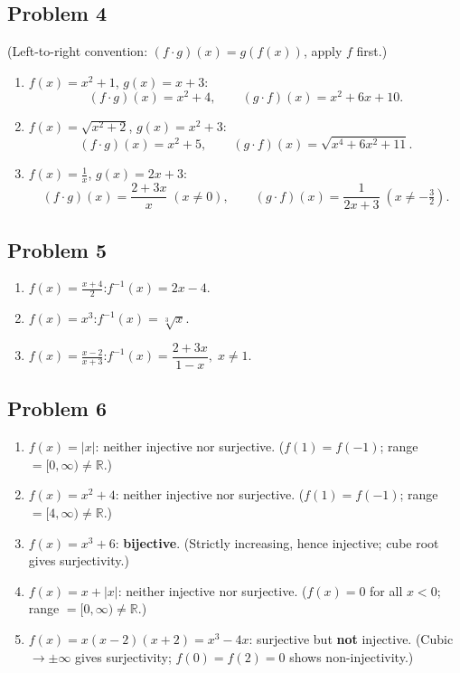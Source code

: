 \subsection*{Problem 4}
(Left-to-right convention: $(f\cdot g)(x)=g(f(x))$, apply $f$ first.)
\begin{enumerate}[label=(\alph*), nosep]
  \item $f(x)=x^2+1$, $g(x)=x+3$:
    \[
      (f\cdot g)(x) = x^2+4, \qquad (g\cdot f)(x) = x^2+6x+10.
    \]
  \item $f(x)=\sqrt{x^2+2}$, $g(x)=x^2+3$:
    \[
      (f\cdot g)(x) = x^2+5, \qquad (g\cdot f)(x) = \sqrt{x^4+6x^2+11}.
    \]
  \item $f(x)=\frac{1}{x}$, $g(x)=2x+3$:
    \[
      (f\cdot g)(x) = \frac{2+3x}{x}\;(x\neq 0), \qquad (g\cdot f)(x) = \frac{1}{2x+3}\;(x\neq -\tfrac{3}{2}).
    \]
\end{enumerate}

\subsection*{Problem 5}
\begin{enumerate}[label=(\alph*), nosep]
  \item $f(x)=\frac{x+4}{2}$:\quad $f^{-1}(x)=2x-4$.
  \item $f(x)=x^3$:\quad $f^{-1}(x)=\sqrt[3]{x}$.
  \item $f(x)=\frac{x-2}{x+3}$:\quad $f^{-1}(x)=\dfrac{2+3x}{1-x},\; x\neq 1$.
\end{enumerate}

\subsection*{Problem 6}
\begin{enumerate}[label=(\alph*), nosep]
  \item $f(x)=|x|$: neither injective nor surjective. ($f(1)=f(-1)$; range $=[0,\infty)\neq\mathbb{R}$.)
  \item $f(x)=x^2+4$: neither injective nor surjective. ($f(1)=f(-1)$; range $=[4,\infty)\neq\mathbb{R}$.)
  \item $f(x)=x^3+6$: \textbf{bijective}. (Strictly increasing, hence injective; cube root gives surjectivity.)
  \item $f(x)=x+|x|$: neither injective nor surjective. ($f(x)=0$ for all $x<0$; range $=[0,\infty)\neq\mathbb{R}$.)
  \item $f(x)=x(x-2)(x+2)=x^3-4x$: surjective but \textbf{not} injective. (Cubic $\to\pm\infty$ gives surjectivity; $f(0)=f(2)=0$ shows non-injectivity.)
\end{enumerate}

